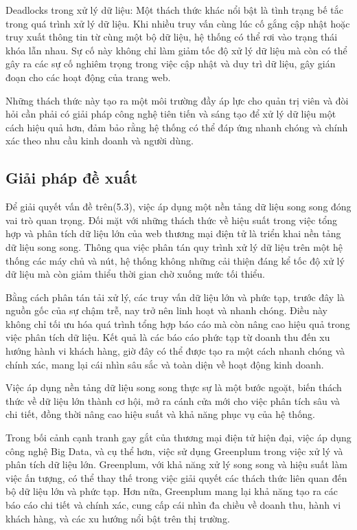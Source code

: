 \documentclass{article}[14pt]
\begin{document}
{{Deadlocks trong xử lý dữ liệu:
Một thách thức khác nổi bật là tình trạng bế tắc trong quá trình xử lý dữ liệu. Khi nhiều truy vấn cùng lúc cố gắng cập nhật hoặc truy xuất thông tin từ cùng một bộ dữ liệu, hệ thống có thể rơi vào trạng thái khóa lẫn nhau. Sự cố này không chỉ làm giảm tốc độ xử lý dữ liệu mà còn có thể gây ra các sự cố nghiêm trọng trong việc cập nhật và duy trì dữ liệu, gây gián đoạn cho các hoạt động của trang web.

Những thách thức này tạo ra một môi trường đầy áp lực cho quản trị viên và đòi hỏi cần phải có giải pháp công nghệ tiên tiến và sáng tạo để xử lý dữ liệu một cách hiệu quả hơn, đảm bảo rằng hệ thống có thể đáp ứng nhanh chóng và chính xác theo nhu cầu kinh doanh và người dùng.




\subsection{Giải pháp đề xuất}
Để giải quyết vấn đề trên(5.3), việc áp dụng một nền tảng dữ liệu song song đóng vai trò quan trọng. Đối mặt với những thách thức về hiệu suất trong việc tổng hợp và phân tích dữ liệu lớn của web thương mại điện tử là triển khai nền tảng dữ liệu song song. Thông qua việc phân tán quy trình xử lý dữ liệu trên một hệ thống các máy chủ và nút, hệ thống không những cải thiện đáng kể tốc độ xử lý dữ liệu mà còn giảm thiểu thời gian chờ xuống mức tối thiểu.

Bằng cách phân tán tải xử lý, các truy vấn dữ liệu lớn và phức tạp, trước đây là nguồn gốc của sự chậm trễ, nay trở nên linh hoạt và nhanh chóng. Điều này không chỉ tối ưu hóa quá trình tổng hợp báo cáo mà còn nâng cao hiệu quả trong việc phân tích dữ liệu. Kết quả là các báo cáo phức tạp từ doanh thu đến xu hướng hành vi khách hàng, giờ đây có thể được tạo ra một cách nhanh chóng và chính xác, mang lại cái nhìn sâu sắc và toàn diện về hoạt động kinh doanh.

Việc áp dụng nền tảng dữ liệu song song thực sự là một bước ngoặt, biến thách thức về dữ liệu lớn thành cơ hội, mở ra cánh cửa mới cho việc phân tích sâu và chi tiết, đồng thời nâng cao hiệu suất và khả năng phục vụ của hệ thống.

Trong bối cảnh cạnh tranh gay gắt của thương mại điện tử hiện đại, việc áp dụng công nghệ Big Data, và cụ thể hơn, việc sử dụng Greenplum trong việc xử lý và phân tích dữ liệu lớn. Greenplum, với khả năng xử lý song song và hiệu suất làm việc ấn tượng, có thể thay thế trong việc giải quyết các thách thức liên quan đến bộ dữ liệu lớn và phức tạp. Hơn nữa, Greenplum mang lại khả năng tạo ra các báo cáo chi tiết và chính xác, cung cấp cái nhìn đa chiều về doanh thu, hành vi khách hàng, và các xu hướng nổi bật trên thị trường.

}}
\end{document}
